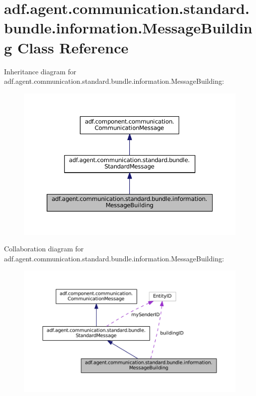 \hypertarget{classadf_1_1agent_1_1communication_1_1standard_1_1bundle_1_1information_1_1MessageBuilding}{}\section{adf.\+agent.\+communication.\+standard.\+bundle.\+information.\+Message\+Building Class Reference}
\label{classadf_1_1agent_1_1communication_1_1standard_1_1bundle_1_1information_1_1MessageBuilding}


Inheritance diagram for adf.\+agent.\+communication.\+standard.\+bundle.\+information.\+Message\+Building\+:
\nopagebreak
\begin{figure}[H]
\begin{center}
\leavevmode
\includegraphics[width=350pt]{classadf_1_1agent_1_1communication_1_1standard_1_1bundle_1_1information_1_1MessageBuilding__inherit__graph}
\end{center}
\end{figure}


Collaboration diagram for adf.\+agent.\+communication.\+standard.\+bundle.\+information.\+Message\+Building\+:
\nopagebreak
\begin{figure}[H]
\begin{center}
\leavevmode
\includegraphics[width=350pt]{classadf_1_1agent_1_1communication_1_1standard_1_1bundle_1_1information_1_1MessageBuilding__coll__graph}
\end{center}
\end{figure}

